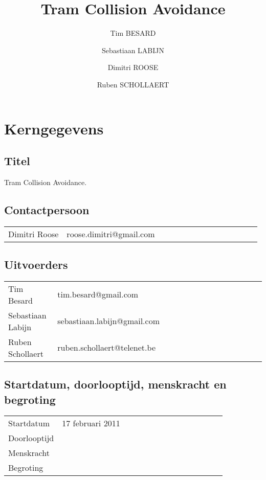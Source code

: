 \documentclass[]{book}
\begin{document}
\title{Tram Collision Avoidance}
\author{Tim BESARD \and Sebastiaan LABIJN \and Dimitri ROOSE \and Ruben SCHOLLAERT}
\date{ }
\maketitle

\section{Kerngegevens}\label{sec:kerngegevens}

\subsection{Titel}\label{sec:Titel}

Tram Collision Avoidance.

\subsection{Contactpersoon} \label{sec:Contactpersoon}

\begin{table}[h]
		\begin{tabular}{*{14}{l}}
		Dimitri Roose & roose.dimitri@gmail.com \\
		\end{tabular}
\end{table}

\subsection{Uitvoerders}\label{sec:Uitvoerders}

\begin{table}[h]
		\begin{tabular}{*{14}{l}}
		Tim Besard & tim.besard@gmail.com \\
		Sebastiaan Labijn & sebastiaan.labijn@gmail.com \\
		Ruben Schollaert & ruben.schollaert@telenet.be \\	
		\end{tabular}
\end{table}

\subsection{Startdatum, doorlooptijd, menskracht en begroting}\label{sec:Startdatum}

\begin{table}[h]
		\begin{tabular}{*{14}{l}}
		Startdatum & 17 februari 2011 \\
		Doorlooptijd & \\
		Menskracht & \\	
		Begroting & \\
		\end{tabular}
\end{table}
\end{document}
